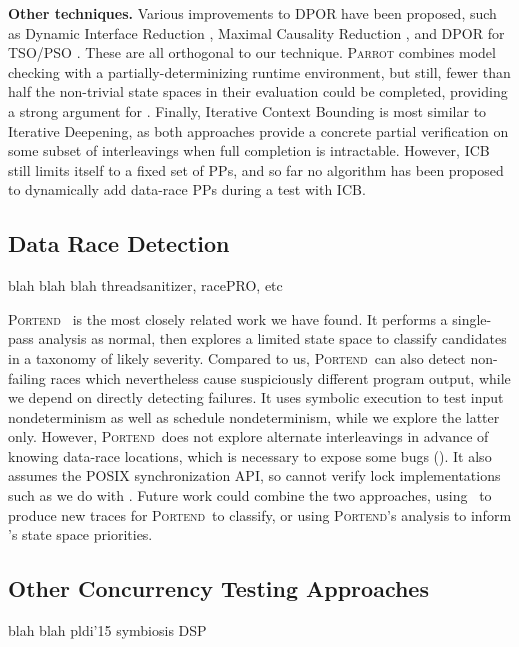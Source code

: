 {\bf Other techniques.} Various improvements to DPOR have been proposed, such as Dynamic Interface Reduction \cite{demeter}, Maximal Causality Reduction \cite{mcr}, and DPOR for TSO/PSO \cite{tsopso}.
These are all orthogonal to our technique.
\textsc{Parrot} \cite{parrot} combines model checking with a partially-determinizing runtime environment, but still, fewer than half the non-trivial state spaces in their evaluation could be completed, providing a strong argument for \quicksand.
Finally, Iterative Context Bounding \cite{chess} is most similar to Iterative Deepening, as both approaches provide a concrete partial verification on some subset of interleavings when full completion is intractable.
However, ICB still limits itself to a fixed set of PPs, and so far no algorithm has been proposed to dynamically add data-race PPs during a test with ICB.

\subsection{Data Race Detection}

blah blah blah threadsanitizer, racePRO, etc

\newcommand\portend{\textsc{Portend}}
\portend~\cite{portend} is the most closely related work we have found.
It performs a single-pass analysis as normal, then explores a limited state space to classify candidates in a taxonomy of likely severity.
Compared to us, \portend~can also detect non-failing races which nevertheless cause suspiciously different program output,
while we depend on directly detecting failures.
It uses symbolic execution to test input nondeterminism as well as schedule nondeterminism,
while we explore the latter only.
However, \portend~does not explore alternate interleavings in advance of knowing data-race locations,
which is necessary to expose some bugs (\sect{\ref{sec:eval-falseneg}}).
It also assumes the POSIX synchronization API, so cannot verify lock implementations such as we do with \mxtest.
Future work could combine the two approaches, using \landslide~to produce new traces for \portend~to classify, or using \portend's analysis to inform \quicksand's state space priorities.

\subsection{Other Concurrency Testing Approaches} %

blah blah pldi'15 symbiosis DSP

